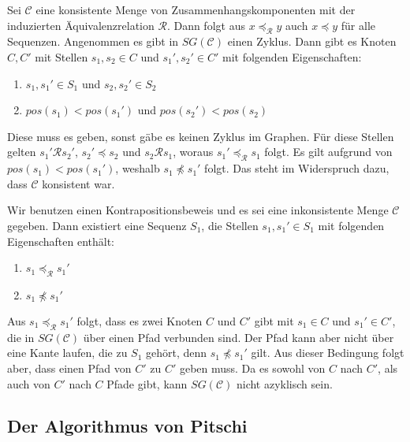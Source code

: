 \begin{beweis}
	\bewhin \hspace{2pt} Sei $\mathcal{C}$ eine konsistente Menge von Zusammenhangskomponenten mit der induzierten Äquivalenzrelation $\mathcal{R}$. Dann folgt aus $x \preceq_{\mathcal{R}} y$ auch $x \preceq y$ für alle Sequenzen. Angenommen es gibt in $SG(\mathcal{C})$ einen Zyklus. Dann gibt es Knoten $C, C'$ mit Stellen $s_1, s_2 \in C$ und $s_1',s_2' \in C'$ mit folgenden Eigenschaften:
	\begin{enumerate}[topsep=0pt,itemsep=-1ex,partopsep=1ex,parsep=1ex]
		\item $s_1, s_1' \in S_1$ und $s_2,s_2' \in S_2$ 
		\item $pos(s_1) < pos(s_1')$ und $pos(s_2') < pos(s_2)$
	\end{enumerate}
	Diese muss es geben, sonst gäbe es keinen Zyklus im Graphen. Für diese Stellen gelten $s_1' \mathcal{R} s_2'$, $s_2' \preceq s_2$ und $s_2 \mathcal{R} s_1$, woraus $s_1' \preceq_{\mathcal{R}} s_1$ folgt. Es gilt aufgrund von $pos(s_1) < pos(s_1')$, weshalb $s_1 \npreceq s_1'$ folgt. Das steht im Widerspruch dazu, dass $\mathcal{C}$ konsistent war.
	
	\bewrueck \hspace{2pt} Wir benutzen einen Kontrapositionsbeweis und es sei eine inkonsistente Menge $\mathcal{C}$ gegeben. Dann existiert eine Sequenz $S_1$, die Stellen $s_1,s_1' \in S_1$ mit folgenden Eigenschaften enthält:
	\begin{enumerate}[topsep=0pt,itemsep=-1ex,partopsep=1ex,parsep=1ex]
		\item $s_1 \preceq_{\mathcal{R}} s_1'$
		\item $s_1 \npreceq s_1'$
	\end{enumerate}
	Aus $s_1 \preceq_{\mathcal{R}} s_1'$ folgt, dass es zwei Knoten $C$ und $C'$ gibt mit $s_1 \in C$ und $s_1' \in C'$, die in $SG(\mathcal{C})$ über einen Pfad verbunden sind. Der Pfad kann aber nicht über eine Kante laufen, die zu $S_1$ gehört, denn $s_1 \npreceq s_1'$ gilt. Aus dieser Bedingung folgt aber, dass einen Pfad von $C'$ zu $C'$ geben muss. Da es sowohl von $C$ nach $C'$, als auch von $C'$ nach $C$ Pfade gibt, kann $SG(\mathcal{C})$ nicht azyklisch sein.
\end{beweis}

\subsection{Der Algorithmus von Pitschi}

